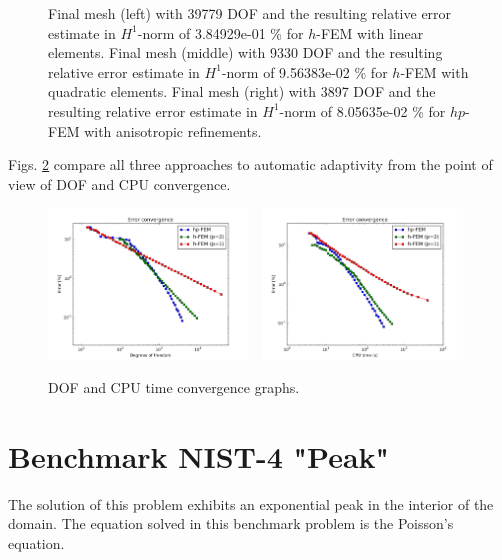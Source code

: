 \documentclass[12pt]{elsarticle}
\begin{document}
\begin{figure}[H]
\vspace{-3mm}
\caption{
Final mesh (left) with 39779 DOF and the resulting
relative error estimate in $H^1$-norm of 3.84929e-01 \% for $h$-FEM with linear elements.
Final mesh (middle) with 9330 DOF and the resulting
relative error estimate in $H^1$-norm of 9.56383e-02 \% for $h$-FEM with quadratic elements.
Final mesh (right) with 3897 DOF and the resulting
relative error estimate in $H^1$-norm of 8.05635e-02 \% for $hp$-FEM with anisotropic refinements.}
\vspace{-4mm}
\label{fig:nist-3-hp-aniso}
\end{figure}

Figs. \ref{fig:nist-3-conv} compare all
three approaches to automatic adaptivity from the point
of view of DOF and CPU convergence.

\begin{figure}[H]
\centering
\vspace{-5mm}
\includegraphics[height=4cm]{nist/nist-3/conv_dof_aniso.png}\ \
\includegraphics[height=4cm]{nist/nist-3/conv_cpu_aniso.png}
\vspace{-4mm}
\caption{DOF and CPU time convergence graphs.}
\vspace{-5mm}
\label{fig:nist-3-conv}
\end{figure}


\section{Benchmark NIST-4 "Peak"}
\label{sec:bench-4}

The solution of this problem exhibits an exponential peak in the interior of the domain.
The equation solved in this benchmark problem is the Poisson's equation.
\end{document}
